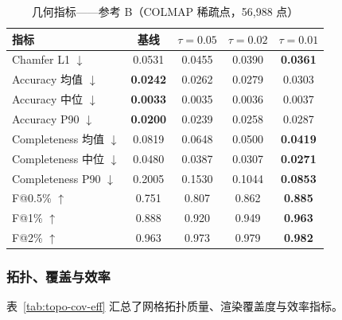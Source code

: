 \begin{table}[H]
\centering\small
\caption{几何指标——参考 B（COLMAP 稀疏点，56{,}988 点）}
\label{tab:geo-refB}
\begin{tabular}{@{}lcccc@{}}
\toprule
\textbf{指标} & \textbf{基线} & $\tau{=}0.05$ & $\tau{=}0.02$ & $\tau{=}0.01$ \\
\midrule
Chamfer L1 $\downarrow$          & 0.0531 & 0.0455 & 0.0390 & \textbf{0.0361} \\
\addlinespace
Accuracy 均值 $\downarrow$       & \textbf{0.0242} & 0.0262 & 0.0279 & 0.0303 \\
Accuracy 中位 $\downarrow$       & \textbf{0.0033} & 0.0035 & 0.0036 & 0.0037 \\
Accuracy P90 $\downarrow$        & \textbf{0.0200} & 0.0239 & 0.0258 & 0.0287 \\
\addlinespace
Completeness 均值 $\downarrow$   & 0.0819 & 0.0648 & 0.0500 & \textbf{0.0419} \\
Completeness 中位 $\downarrow$   & 0.0480 & 0.0387 & 0.0307 & \textbf{0.0271} \\
Completeness P90 $\downarrow$    & 0.2005 & 0.1530 & 0.1044 & \textbf{0.0853} \\
\addlinespace
F@0.5\% $\uparrow$              & 0.751 & 0.807 & 0.862 & \textbf{0.885} \\
F@1\% $\uparrow$                & 0.888 & 0.920 & 0.949 & \textbf{0.963} \\
F@2\% $\uparrow$                & 0.963 & 0.973 & 0.979 & \textbf{0.982} \\
\bottomrule
\end{tabular}
\end{table}

\subsubsection{拓扑、覆盖与效率}
\label{ssec:baseline-topo}

表~\ref{tab:topo-cov-eff} 汇总了网格拓扑质量、渲染覆盖度与效率指标。

